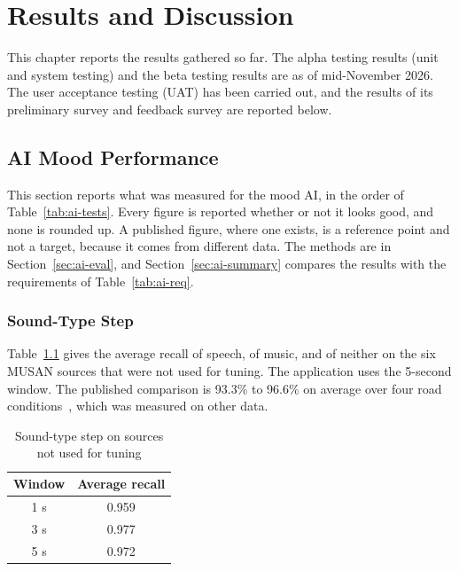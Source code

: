 \chapter{Results and Discussion}

This chapter reports the results gathered so far. The alpha testing results (unit and system testing) and the beta testing results are as of mid-November 2026. The user acceptance testing (UAT) has been carried out, and the results of its preliminary survey and feedback survey are reported below.

\section{AI Mood Performance}
\label{sec:ai-results}
This section reports what was measured for the mood AI, in the order of Table~\ref{tab:ai-tests}. Every figure is reported whether or not it looks good, and none is rounded up. A published figure, where one exists, is a reference point and not a target, because it comes from different data. The methods are in Section~\ref{sec:ai-eval}, and Section~\ref{sec:ai-summary} compares the results with the requirements of Table~\ref{tab:ai-req}.

\subsection{Sound-Type Step}
\label{sec:ai-soundtype}
Table~\ref{tab:ai-sound} gives the average recall of speech, of music, and of neither on the six MUSAN sources that were not used for tuning. The application uses the 5-second window. The published comparison is 93.3\% to 96.6\% on average over four road conditions~\cite{won2017adaptive}, which was measured on other data.

\begin{table}[htbp]
    \centering
    \caption{Sound-type step on sources not used for tuning}\label{tab:ai-sound}
    \small
    \renewcommand{\arraystretch}{1.2}
    \begin{tabular}{|c|c|}
        \hline
        \textbf{Window} & \textbf{Average recall} \\
        \hline
        1 s & 0.959 \\
        \hline
        3 s & 0.977 \\
        \hline
        5 s & 0.972 \\
        \hline
    \end{tabular}
\end{table}

